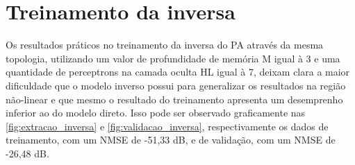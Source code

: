 \section{Treinamento da inversa} \label{sec:estudoi-inv}
Os resultados práticos no treinamento da inversa do PA através da mesma topologia, utilizando um valor de profundidade de memória M igual à 3 e uma quantidade de perceptrons na camada oculta HL igual à 7, deixam clara a maior dificuldade que o modelo inverso possui para generalizar os resultados na região não-linear e que mesmo o resultado do treinamento apresenta um desemprenho inferior ao do modelo direto. Isso pode ser observado graficamente nas \autoref{fig:extracao_inversa} e \autoref{fig:validacao_inversa}, respectivamente os dados de treinamento, com um NMSE de -51,33 dB, e de validação, com um NMSE de -26,48 dB.
